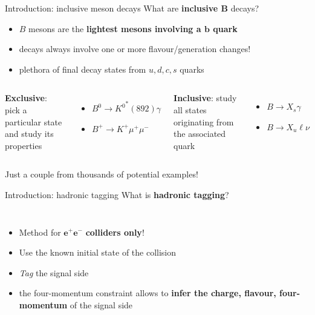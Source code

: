 \documentclass[xcolor=dvipsnames]{beamer}
\begin{document}
\begin{frame}{Introduction: inclusive \safeB meson decays}
   \centering\small
   {\normalsize What are \textbf{inclusive $\bm{B}$} decays?}

   \begin{itemize}
      \item $B$ mesons are the \textbf{lightest mesons involving a $\bm{b}$ quark}
      \item[\ra] decays always involve one or more flavour/generation changes!
      \item[\ra] plethora of final decay states from $u, d, c, s$ quarks
   \end{itemize}

   \vspace{10pt}

   \begin{columns}
      \centering
         \textbf{Exclusive}: pick a particular state and study its properties
            \begin{itemize}
               \item $B^0\to{K^0}^*(892)\gamma$
               \item $B^+\to K^+\mu^+\mu^-$
            \end{itemize}
      \centering
         \textbf{Inclusive}: study all states originating from the associated quark
         \begin{itemize}
            \item $B\to X_s \gamma$
            \item $B\to X_u \ell \nu$
         \end{itemize}
   \end{columns}
   
   \vspace{10pt}
   Just a couple from thousands of potential examples!

\end{frame}

\begin{frame}{Introduction: hadronic tagging}
\centering\small
{\normalsize What is \textbf{hadronic tagging}?}

\vspace{10pt}

\begin{columns}
   

   \begin{itemize}
      \item Method for $\boldsymbol{e^+}\boldsymbol{e^-}$ \textbf{colliders only}!
      \item Use the known initial state of the \epem collision
      \item \textit{Tag} the signal side
      \item the four-momentum constraint allows to \textbf{infer the charge, flavour, four-momentum} of the signal side
   \end{itemize}
\end{columns}


\end{frame}
\end{document}

